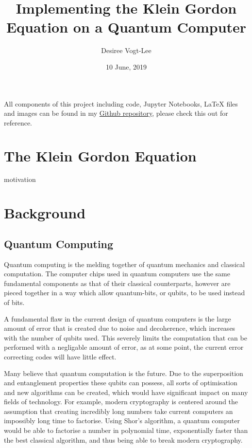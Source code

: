 \documentclass{article}
\title{Implementing the Klein Gordon Equation on a Quantum Computer}
\author{Desiree Vogt-Lee}
\date{10 June, 2019}
\begin{document}
	\maketitle
	\begin{center}
	    All components of this project including code, Jupyter Notebooks, LaTeX files and images can be found in my \href{https://github.com/desireevl/PHYS3051}{Github repository}, please check this out for reference.
	\end{center}


\section{The Klein Gordon Equation}

motivation 

\section{Background}
\subsection{Quantum Computing}
Quantum computing is the melding together of quantum mechanics and classical computation. The computer chips used in quantum computers use the same fundamental components as that of their classical counterparts, however are pieced together in a way which allow quantum-bits, or qubits, to be used instead of bits. 

A fundamental flaw in the current design of quantum computers is the large amount of error that is created due to noise and decoherence, which increases with the number of qubits used. This severely limits the computation that can be performed with a negligable amount of error, as at some point, the current error correcting codes will have little effect. 

Many believe that quantum computation is the future. Due to the superposition and entanglement properties these qubits can possess, all sorts of optimisation and new algorithms can be created, which would have significant impact on many fields of technology. For example, modern cryptography is centered around the assumption that creating incredibly long numbers take current computers an impossibly long time to factorise. Using Shor's algorithm, a quantum computer would be able to factorise a number in polynomial time, exponentially faster than the best classical algorithm, and thus being able to break modern cryptography. \cite{minutephysics}
\end{document}
